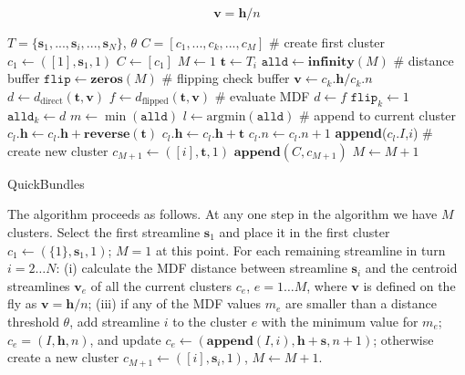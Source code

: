 \documentclass{bioinfo}
\begin{document}
\begin{methods}
\begin{equation}
  \mathbf{v} = \mathbf{h} / n
\end{equation}

\begin{algorithm}[h]
\begin{algorithmic}
\REQUIRE $T=\{\mathbf{s}_{1},...,\mathbf{s}_{i},...,\mathbf{s}_{N}\}$, $\theta$
\ENSURE $C=[c_{1},...,c_{k},...,c_{M}]$ 
\STATE \# create first cluster
\STATE $c_{1} \leftarrow ([1],\mathbf{s}_{1},1)$
\STATE $C\leftarrow[c_{1}]$
\STATE $M\leftarrow1$ 
	\STATE $\textbf{t}\leftarrow T_{i}$
	\STATE $\texttt{alld}\leftarrow\textbf{infinity}(M)$ \# distance buffer
	\STATE $\texttt{flip}\leftarrow\textbf{zeros}(M)$ \# flipping check buffer
		\STATE $\mathbf{v}\leftarrow c_{k}.\mathbf{h}/c_{k}.n$
		\STATE $d\leftarrow d_{\textrm{direct}}(\mathbf{t},\mathbf{v})$
		\STATE $f\leftarrow d_{\textrm{flipped}}(\mathbf{t},\mathbf{v})$
	\STATE \# evaluate MDF
		\STATE $d \leftarrow f$
		\STATE $\texttt{flip}_{k} \leftarrow 1$
	\ENDIF
	\STATE $\texttt{alld}_{k} \leftarrow d$
	\ENDFOR
\STATE $m\leftarrow \min(\texttt{alld})$
\STATE $l\leftarrow \mathrm{arg min}(\texttt{alld})$
\STATE \# append to current cluster
		\STATE $c_{l}.\mathbf{h} \leftarrow c_{l}.\mathbf{h} + \textbf{reverse}(\textbf{t})$
	\ELSE
		\STATE $c_{l}.\mathbf{h} \leftarrow c_{l}.\mathbf{h} + \textbf{t}$
	\ENDIF
	\STATE $c_{l}.n \leftarrow c_{l}.n + 1$
	\STATE \textbf{append}($c_{l}.I$,$i$)
\ELSE 
\STATE \# create new cluster
        \STATE $c_{M+1} \leftarrow ([i],\mathbf{t},1)$
        \STATE $\mathbf{append}(C,c_{M+1})$
	\STATE $M\leftarrow M+1$
\ENDIF
\ENDFOR 
\end{algorithmic}
\caption{QuickBundles}
\label{Alg:QuickBundles}
\end{algorithm}

The algorithm proceeds as follows.  At any one step in the algorithm we
have $M$ clusters. Select the first streamline $\mathbf{s}_{1}$ and
place it in the first cluster $c_{1}\leftarrow(\{1\},\mathbf{s}_{1},1)$;
$M=1$ at this point.  For each remaining streamline in turn $i = 2 \dots
N$: (i) calculate the MDF distance between streamline $\mathbf{s}_{i}$
and the centroid streamlines $\mathbf{v}_{e}$ of all the current clusters
$c_{e}$, $e = 1 \dots M$, where $\mathbf{v}$ is defined on the fly as
$\mathbf{v}=\mathbf{h}/n$; (iii) if any of the MDF values $m_{e}$ are
smaller than a distance threshold $\theta$, add streamline $i$ to the
cluster $e$ with the minimum value for $m_{e}$;
$c_{e}=(I,\mathbf{h},n)$, and update
$c_{e}\leftarrow(\mathbf{append}(I,i),\mathbf{h}+\mathbf{s},n+1)$;
otherwise create a new cluster
$c_{M+1}\leftarrow([i],\mathbf{s}_{i},1)$, $M\leftarrow M+1$.


\end{methods}
\end{document}
